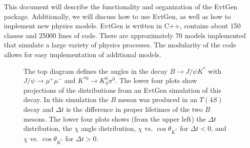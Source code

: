 This document will describe the functionality and 
organization of the EvtGen package.  Additionally, 
we will discuss how to use EvtGen, as well as how to
implement new physics models. 
EvtGen is written in C++, contains about 150 classes and
25000 lines of code. There are approximately 70 models implemented 
that simulate a large variety of physics processes.  The modularity
of the code allows for easy implementation of additional
models.  


\begin{figure}[b]
\begin{center}
\end{center}
\caption{
The top diagram defines the angles in the decay $B \rightarrow J/\psi K^*$
with $J/\psi\rightarrow \mu^+\mu^-$ and $K^{*0}\rightarrow K^0_S\pi^0$. 
The lower four plots show projections of the distributions from an EvtGen
simulation of this decay. In this simulation the $B$ meson was produced
in an $\Upsilon(4S)$ decay and $\Delta t$ is the difference in proper
lifetimes of the two $B$ mesons.
The lower four plots shows (from the upper left) the $\Delta t$ distribution,
the $\chi$ angle distribution, $\chi$ vs. $\cos \theta_{K^*}$ for
$\Delta t < 0$, and $\chi$ vs. $\cos \theta_{K^*}$ for
$\Delta t > 0$.
\label{fig:cpvio}
}
\end{figure}



%






